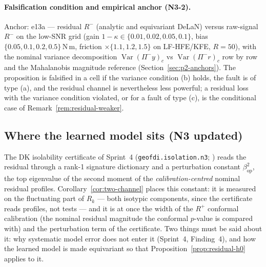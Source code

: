 \paragraph{Falsification condition and empirical anchor (N3-2).}
Anchor: e13a --- residual $R^{-}$ (analytic and equivariant DeLaN) versus
raw-signal $R^{-}$ on the low-SNR grid (gain $1-\kappa \in \{0.01, 0.02,
0.05, 0.1\}$, bias $\{0.05, 0.1, 0.2, 0.5\}$\,N\,m, friction $\times\{1.1,
1.2, 1.5\}$ on LF-HFE/KFE, $R = 50$), with the nominal variance
decomposition $\operatorname{Var}(\Pi^-y)_c$ vs $\operatorname{Var}(\Pi^-r)_c$
row by row and the Mahalanobis magnitude reference
(Section~\ref{sec:p2-anchors}). The proposition is falsified in a cell if
the variance condition (b) holds, the fault is of type (a), and the residual
channel is nevertheless less powerful; a residual loss with the variance
condition violated, or for a fault of type (c), is the conditional case of
Remark~\ref{rem:residual-weaker}.

\subsection{Where the learned model sits (N3 updated)}
\label{sec:p2-learning}

The DK isolability certificate of Sprint~4 (\texttt{geofdi.isolation.n3};
\cite{yu2015daviskahan}) reads the residual through a rank-1 signature
dictionary and a perturbation constant $\beta_{\mathrm{op}}^2$, the top
eigenvalue of the second moment of the \emph{calibration-centred} nominal
residual profiles. Corollary~\ref{cor:two-channel} places this constant: it
is measured on the fluctuating part of $R_k$ --- both isotypic components,
since the certificate reads profiles, not tests --- and it is at once the
width of the $R^{+}$ conformal calibration (the nominal residual magnitude
the conformal $p$-value is compared with) and the perturbation term of the
certificate. Two things must be said about it: why systematic model error
does not enter it (Sprint~4, Finding~4), and how the learned model is made
equivariant so that Proposition~\ref{prop:residual-h0} applies to it.

